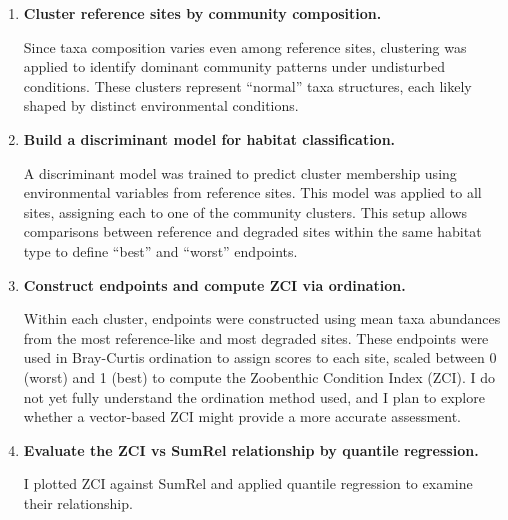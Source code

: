 \begin{enumerate}
\item \textbf{Cluster reference sites by community composition.}

Since taxa composition varies even among reference sites, clustering was applied to identify dominant community patterns under undisturbed conditions. These clusters represent “normal” taxa structures, each likely shaped by distinct environmental conditions.

\item \textbf{Build a discriminant model for habitat classification.}

A discriminant model was trained to predict cluster membership using environmental variables from reference sites. This model was applied to all sites, assigning each to one of the community clusters. This setup allows comparisons between reference and degraded sites within the same habitat type to define “best” and “worst” endpoints.

\item \textbf{Construct endpoints and compute ZCI via ordination.}

Within each cluster, endpoints were constructed using mean taxa abundances from the most reference-like and most degraded sites. These endpoints were used in Bray-Curtis ordination to assign scores to each site, scaled between 0 (worst) and 1 (best) to compute the Zoobenthic Condition Index (ZCI). I do not yet fully understand the ordination method used, and I plan to explore whether a vector-based ZCI might provide a more accurate assessment.

\item \textbf{Evaluate the ZCI vs SumRel relationship by quantile regression.}

I plotted ZCI against SumRel and applied quantile regression to examine their relationship.

\end{enumerate}
